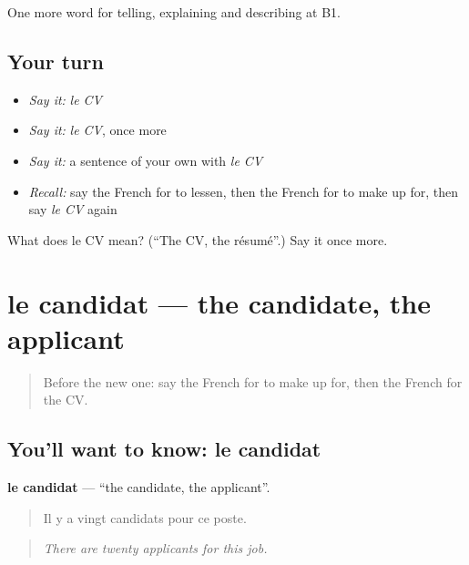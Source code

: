 \begin{grammarlens}[title={What you've built}]
One more word for telling, explaining and describing at B1.
\end{grammarlens}

\subsection*{Your turn}
\begin{itemize}
\raggedright
  \item \emph{Say it:} \emph{le CV}
  \item \emph{Say it:} \emph{le CV}, once more
  \item \emph{Say it:} a sentence of your own with \emph{le CV}
  \item \emph{Recall:} say the French for to lessen, then the French for to make up for, then say \emph{le CV} again
\end{itemize}

\begin{tcolorbox}[breakable,colback=teal!4,colframe=teal!35!black,title={Before you move on}]
What does le CV mean? (\textquotedblleft{}The CV, the résumé\textquotedblright{}.) Say it once more.
\end{tcolorbox}
\section[le candidat]{le candidat — the candidate, the applicant}

\label{lesson:FR-C354-candidat}



\begin{quote}
Before the new one: say the French for to make up for, then the French for the CV.
\end{quote}

\subsection*{You'll want to know: le candidat}
\textbf{le candidat} — \textquotedblleft{}the candidate, the applicant\textquotedblright{}.

\begin{quote}
Il y a vingt candidats pour ce poste.
\end{quote}

\begin{quote}
\emph{There are twenty applicants for this job.}
\end{quote}

